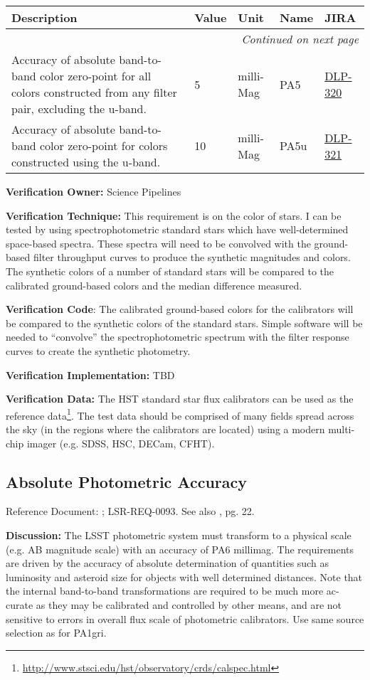\documentclass[DM,lsstdraft,toc]{lsstdoc}
\makeatletter
\newcommand{\jira}[1]{\href{https://jira.lsstcorp.org/browse/#1}{#1}}
\newenvironment{metric}[0]{%
\setlength\LTleft{0pt}
\setlength\LTright{\fill}
\begin{longtable}[]{@{}p{0.4\textwidth}lp{0.75in}p{1.3in}p{0.75in}@{}}

\hline \textbf{Description} & \textbf{Value} & \textbf{Unit} & \textbf{Name} & \textbf{JIRA} \\ \hline
\endhead

\hline \multicolumn{5}{r}{\emph{Continued on next page}} \\
\endfoot

\hline\hline
\endlastfoot
}{%
\hline
\end{longtable}
}
\makeatother
\begin{document}
\begin{metric}
Accuracy of absolute band-to-band color zero-point for all colors
constructed from any filter pair, excluding the u-band. & 5 & milli-Mag
& PA5 & \jira{DLP-320}\tabularnewline
Accuracy of absolute band-to-band color zero-point for colors
constructed using the u-band. & 10 & milli-Mag & PA5u &
\jira{DLP-321}\tabularnewline
\end{metric}

\textbf{Verification Owner:} Science Pipelines

\textbf{Verification Technique:} This requirement is on the color of
stars. I can be tested by using spectrophotometric standard stars which
have well-determined space-based spectra. These spectra will need to be
convolved with the ground-based filter throughput curves to produce the
synthetic magnitudes and colors. The synthetic colors of a number of
standard stars will be compared to the calibrated ground-based colors
and the median difference measured.

\textbf{Verification Code}: The calibrated ground-based colors for the
calibrators will be compared to the synthetic colors of the standard
stars. Simple software will be needed to ``convolve'' the
spectrophotometric spectrum with the filter response curves to create
the synthetic photometry.

\textbf{Verification Implementation:} TBD

\textbf{Verification Data:} The HST standard star flux calibrators can
be used as the reference data\footnote{\url{http://www.stsci.edu/hst/observatory/crds/calspec.html}}. The test data
should be comprised of many fields spread across the sky (in the regions
where the calibrators are located) using a modern multi-chip imager
(e.g. SDSS, HSC, DECam, CFHT).

\subsection{Absolute Photometric
Accuracy}\label{absolute-photometric-accuracy}

Reference Document: ; LSR-REQ-0093. See also \SRD, pg. 22.

\textbf{Discussion:} The LSST photometric system must transform to a
physical scale (e.g. AB magnitude scale) with an accuracy of PA6
millimag. The requirements are driven by the accuracy of absolute
determination of quantities such as luminosity and asteroid size for
objects with well determined distances. Note that the internal
band-to-band transformations are required to be much more ac- curate as
they may be calibrated and controlled by other means, and are not
sensitive to errors in overall flux scale of photometric calibrators.
Use same source selection as for PA1gri.
\end{document}
